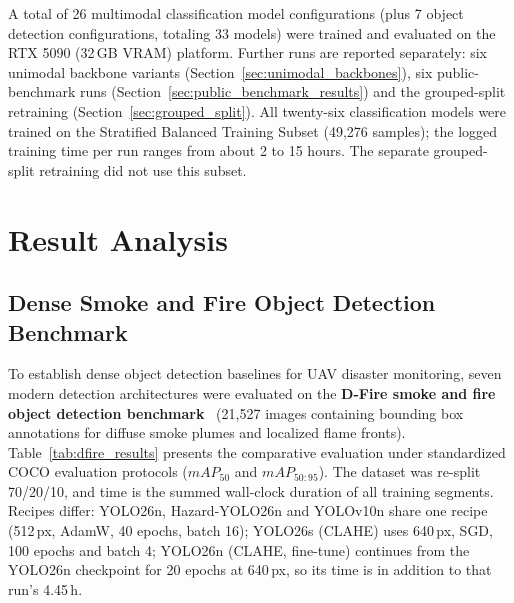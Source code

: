 \documentclass[journal]{IEEEtran}
\begin{document}
A total of 26 multimodal classification model configurations (plus 7 object detection configurations, totaling 33 models) were trained and evaluated on the RTX 5090 (32\,GB VRAM) platform. Further runs are reported separately: six unimodal backbone variants (Section~\ref{sec:unimodal_backbones}), six public-benchmark runs (Section~\ref{sec:public_benchmark_results}) and the grouped-split retraining (Section~\ref{sec:grouped_split}). All twenty-six classification models were trained on the Stratified Balanced Training Subset (49{,}276 samples); the logged training time per run ranges from about 2 to 15 hours. The separate grouped-split retraining did not use this subset.


\section{Result Analysis}


\subsection{Dense Smoke and Fire Object Detection Benchmark}
\label{sec:object_detection}

To establish dense object detection baselines for UAV disaster monitoring, seven modern detection architectures were evaluated on the \textbf{D-Fire smoke and fire object detection benchmark}~\cite{dfire2022} (21{,}527 images containing bounding box annotations for diffuse smoke plumes and localized flame fronts). Table~\ref{tab:dfire_results} presents the comparative evaluation under standardized COCO evaluation protocols ($mAP_{50}$ and $mAP_{50:95}$). The dataset was re-split 70/20/10, and time is the summed wall-clock duration of all training segments. Recipes differ: YOLO26n, Hazard-YOLO26n and YOLOv10n share one recipe (512\,px, AdamW, 40 epochs, batch 16); YOLO26s (CLAHE) uses 640\,px, SGD, 100 epochs and batch 4; YOLO26n (CLAHE, fine-tune) continues from the YOLO26n checkpoint for 20 epochs at 640\,px, so its time is in addition to that run's 4.45\,h.
\end{document}
